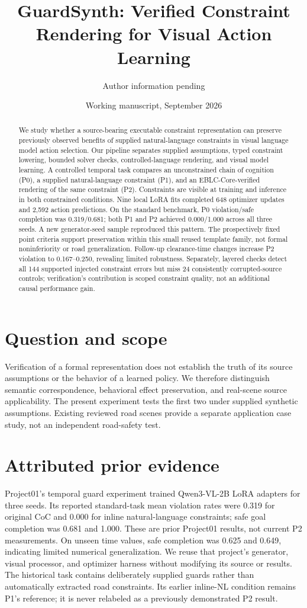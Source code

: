 \documentclass[11pt]{article}
\title{GuardSynth: Verified Constraint Rendering for Visual Action Learning}
\author{Author information pending}
\date{Working manuscript, September 2026}
\begin{document}
\maketitle
\begin{abstract}
We study whether a source-bearing executable constraint representation can preserve
previously observed benefits of supplied natural-language constraints in visual
language model action selection. Our pipeline separates supplied assumptions,
typed constraint lowering, bounded solver checks, controlled-language rendering,
and visual model learning. A controlled temporal task compares an unconstrained
chain of cognition (P0), a supplied natural-language constraint (P1), and an
EBLC-Core-verified rendering of the same constraint (P2). Constraints are visible
at training and inference in both constrained conditions. Nine local LoRA fits
completed 648 optimizer updates and 2,592 action predictions. On the standard
benchmark, P0 violation/safe completion was 0.319/0.681; both P1 and P2 achieved
0.000/1.000 across all three seeds. A new generator-seed sample reproduced this
pattern. The prospectively fixed point criteria support preservation within this
small reused template family, not formal noninferiority or road generalization.
Follow-up clearance-time changes increase P2 violation to 0.167--0.250,
revealing limited robustness. Separately, layered checks detect all 144 supported
injected constraint errors but miss 24 consistently corrupted-source controls;
verification's contribution is scoped constraint quality, not an additional
causal performance gain.
\end{abstract}
\section{Question and scope}
Verification of a formal representation does not establish the truth of its
source assumptions or the behavior of a learned policy. We therefore distinguish
semantic correspondence, behavioral effect preservation, and real-scene source
applicability. The present experiment tests the first two under supplied synthetic
assumptions. Existing reviewed road scenes provide a separate application case
study, not an independent road-safety test.
\section{Attributed prior evidence}
Project01's temporal guard experiment trained Qwen3-VL-2B LoRA adapters for three
seeds. Its reported standard-task mean violation rates were 0.319 for original
CoC and 0.000 for inline natural-language constraints; safe goal completion was
0.681 and 1.000. These are prior Project01 results, not current P2 measurements.
On unseen time values, safe completion was 0.625 and 0.649, indicating limited
numerical generalization. We reuse that project's generator, visual processor,
and optimizer harness without modifying its source or results.
The historical task contains deliberately supplied guards rather than automatically
extracted road constraints. Its earlier inline-NL condition remains P1's reference;
it is never relabeled as a previously demonstrated P2 result.
\end{document}
